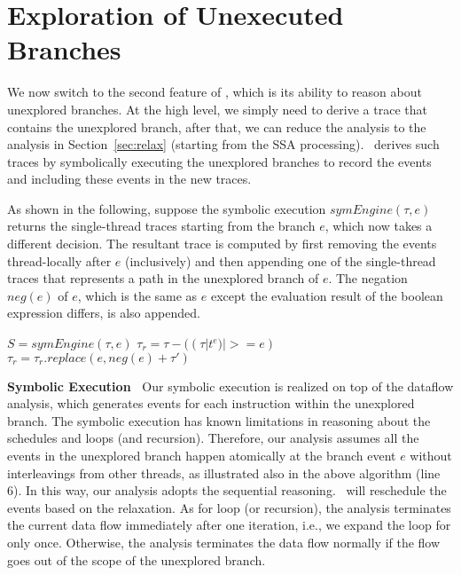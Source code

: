 \section{Exploration of Unexecuted Branches}
We now switch to the second feature of \tool, which is its ability to reason about unexplored branches.
At the high level, we simply need to derive a trace that contains the unexplored branch, after that, we can reduce the analysis to the analysis in Section~\ref{sec:relax} (starting from the SSA processing).  \tool\ derives such traces by symbolically executing the unexplored branches to record the events and including these events in the new traces.


As shown in the following, suppose the symbolic execution  $symEngine(\tau, e)$ returns the single-thread traces starting from the branch $e$, which now takes a different decision. The resultant trace is computed by first removing the events thread-locally after $e$ (inclusively) and then appending one of the single-thread traces that represents a path in the unexplored branch of $e$. The negation $neg(e)$ of $e$, which is the same as $e$ except the evaluation result of the boolean expression differs, is also appended.



\begin{algorithmic}[3]
    \State $S=symEngine(\tau, e)$
	\State $\tau_r=\tau-((\tau|t^e)|>=e)$
	\State $\tau_r=\tau_r.replace(e, neg(e) + \tau')$
	\EndFor
 \EndIf
\EndFor
\end{algorithmic}


{\bf Symbolic Execution\ } Our symbolic execution is realized on top of the dataflow analysis, which generates events for each instruction within the unexplored branch.
The symbolic execution has known limitations in reasoning about the schedules and loops (and recursion). Therefore, our analysis assumes all the events in the unexplored branch happen atomically at the branch event $e$ without interleavings from other threads, as illustrated also in the above algorithm (line 6). In this way, our analysis adopts the sequential reasoning. \tool\ will reschedule the events based on the relaxation. As for loop (or recursion), the analysis terminates the current data flow immediately after one iteration, i.e., we expand the loop for only once. Otherwise, the analysis terminates the data flow normally if the flow goes out of the scope of the unexplored branch.

